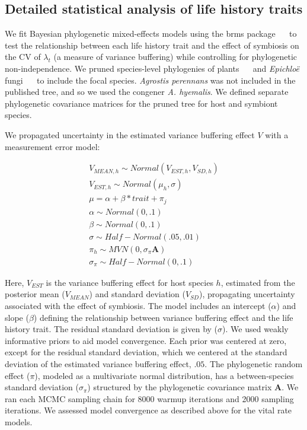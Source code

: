 \documentclass[lineno, sn-basic]{sn-jnl}%
\providecommand{\DIFadd}[1]{{\protect\color{blue}#1}} %
\providecommand{\DIFadd}[1]{{\protect\color{blue}\uwave{#1}}} %
\begin{document}
\subsection{\DIFadd{Detailed statistical analysis of life history traits}}\label{SupMethods4}
\DIFadd{We fit Bayesian phylogenetic mixed-effects models using the brms package \mbox{%
\citep{Burkner2017brms} }\hspace{0pt}%
to test the relationship between each life history trait and the effect of symbiosis on the CV of $\lambda_{t}$ (a measure of variance buffering) while controlling for phylogenetic non-independence.
We pruned species-level phylogenies of plants \mbox{%
\citep{zanne2014three} }\hspace{0pt}%
and }\emph{\DIFadd{Epichlo\"{e}}} \DIFadd{fungi \mbox{%
\citep{leuchtmann2014nomenclatural} }\hspace{0pt}%
to include the focal species.
}\emph{\DIFadd{Agrostis perennans}} \DIFadd{was not included in the published tree, and so we used the congener }\emph{\DIFadd{A. hyemalis}}\DIFadd{. 
We defined separate phylogenetic covariance matrices for the pruned tree for host and symbiont species.
}

\DIFadd{We propagated uncertainty in the estimated variance buffering effect $V$ with a measurement error model:
}

\begin{subequations}
	\begin{align}
		V_{MEAN,h} \sim Normal(V_{EST,h}, V_{SD,h})\\
		V_{EST,h} \sim Normal(\mu_h,\sigma)\\
		\mu = \alpha + \beta*trait + \pi _j\\
		\alpha \sim Normal(0,.1)\\
		\beta \sim Normal(0,.1)\\
		\sigma \sim Half-Normal(.05,.01)\\
		\pi_h \sim MVN(0,\sigma_{\pi}\mathbf{A})\\
		\sigma_{\pi} \sim Half-Normal(0,.1)
	\end{align}
\end{subequations}

\DIFadd{Here, $V_{EST}$ is the variance buffering effect for host species $h$, estimated from the posterior mean ($V_{MEAN}$) and standard deviation ($V_{SD}$), propagating uncertainty associated with the effect of symbiosis.
The model includes an intercept ($\alpha$) and slope ($\beta$) defining the relationship between variance buffering effect and the life history trait. 
The residual standard deviation is given by ($\sigma$). 
We used weakly informative priors to aid model convergence.
Each prior was centered at zero, except for the residual standard deviation, which we centered at the standard deviation of the estimated variance buffering effect, $.05$.
The phylogenetic random effect ($\pi$), modeled as a multivariate normal distribution, has a between-species standard deviation ($\sigma_{\pi}$) structured by the phylogenetic covariance matrix }\textbf{\DIFadd{A}}\DIFadd{.
We ran each MCMC sampling chain for 8000 warmup iterations and 2000 sampling iterations. 
We assessed model convergence as described above for the vital rate models.
}
\end{document}
